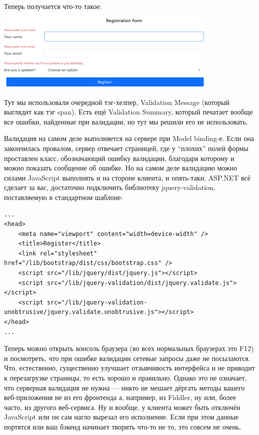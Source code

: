\documentclass{../../text-style}
\begin{document}
Теперь получается что-то такое:

\begin{center}
    \includegraphics[width=0.8\textwidth]{validationError.png}
\end{center}

Тут мы использовали очередной тэг-хелпер, Validation Message (который выглядит как тэг span). Есть ещё Validation Summary, который печатает вообще все ошибки, найденные при валидации, но тут мы решили его не использовать.

Валидация на самом деле выполняется на сервере при Model binding-е. Если она закончилась провалом, сервер отвечает страницей, где у \enquote{плохих} полей формы проставлен класс, обозначающий ошибку валидации, благодаря которому и можно показать сообщение об ошибке. Но на самом деле валидацию можно силами JavaScript выполнять и на стороне клиента, и опять-таки, ASP.NET всё сделает за вас, достаточно подключить библиотеку jquery-validation, поставляемую в стандартном шаблоне:

\begin{verbatim}
...
<head>
    <meta name="viewport" content="width=device-width" />
    <title>Register</title>
    <link rel="stylesheet" href="/lib/bootstrap/dist/css/bootstrap.css" />
    <script src="/lib/jquery/dist/jquery.js"></script>
    <script src="/lib/jquery-validation/dist/jquery.validate.js"></script>
    <script src="/lib/jquery-validation-unobtrusive/jquery.validate.unobtrusive.js"></script>
</head>
...
\end{verbatim}

Теперь можно открыть консоль браузера (во всех нормальных браузерах это F12) и посмотреть, что при ошибке валидации сетевые запросы даже не посылаются. Что, естественно, существенно улучшает отзывчивость интерфейса и не приводит к перезагрузке страницы, то есть хорошо и правильно. Однако это не означает, что серверная валидация не нужна --- никто не мешает дёргать методы вашего веб-приложения не из его фронтенда а, например, из Fiddler, ну или, более часто, из другого веб-сервиса. Ну и вообще, у клиента может быть отключён JavaScript или он сам нагло вырезал его исполнение. Если при этом данные портятся или ваш бэкенд начинает творить что-то не то, это совсем не очень.
\end{document}
